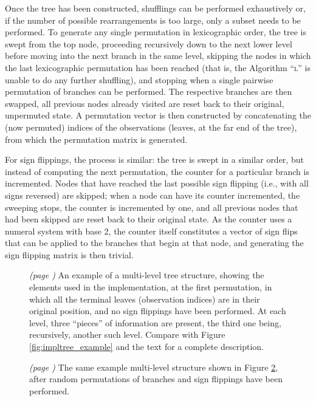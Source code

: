 Once the tree has been constructed, shufflings can be performed exhaustively or, if the number of possible rearrangements is too large, only a subset needs to be performed. To generate any single permutation in lexicographic order, the tree is swept from the top node, proceeding recursively down to the next lower level before moving into the next branch in the same level, skipping the nodes in which the last lexicographic permutation has been reached (that is, the Algorithm ``\textsc{l}'' is unable to do any further shuffling), and stopping when a single pairwise permutation of branches can be performed. The respective branches are then swapped, all previous nodes already visited are reset back to their original, unpermuted state. A permutation vector is then constructed by concatenating the (now permuted) indices of the observations (leaves, at the far end of the tree), from which the permutation matrix is generated.

For sign flippings, the process is similar: the tree is swept in a similar order, but instead of computing the next permutation, the counter for a particular branch is incremented. Nodes that have reached the last possible sign flipping (i.e., with all signs reversed) are skipped; when a node can have its counter incremented, the sweeping stops, the counter is incremented by one, and all previous nodes that had been skipped are reset back to their original state. As the counter uses a numeral system with base 2, the counter itself constitutes a vector of sign flips that can be applied to the branches that begin at that node, and generating the sign flipping matrix is then trivial.

\begin{figure}[!b]
\caption[The multi-level structure used in the implementation, at the first permutation.]{\emph{(page \pageref{fig:impltree_default_noref})} An example of a multi-level tree structure, showing the elements used in the implementation, at the first permutation, in which all the terminal leaves (observation indices) are in their original position, and no sign flippings have been performed. At each level, three ``pieces'' of information are present, the third one being, recursively, another such level. Compare with Figure \ref{fig:impltree_example} and the text for a complete description.}
\label{fig:impltree_default}
\end{figure}

\begin{figure}[!b]
\caption[The multi-level structure used in the implementation, after random shufflings.]{\emph{(page \pageref{fig:impltree_shuffled_noref})} The same example multi-level structure shown in Figure \ref{fig:impltree_shuffled}, after random permutations of branches and sign flippings have been performed.}
\label{fig:impltree_shuffled}
\end{figure}


